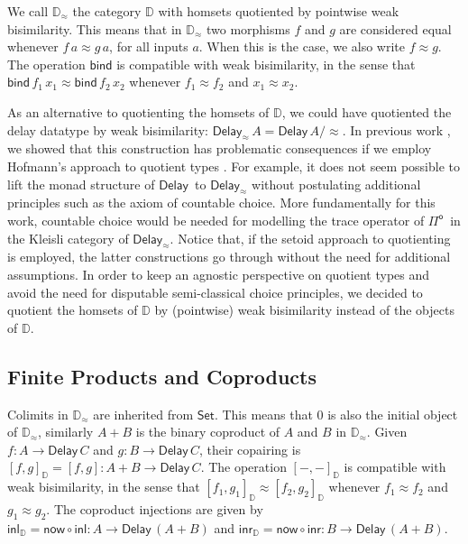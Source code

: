 \documentclass[runningheads,a4paper]{llncs}
\newcommand{\Pio}{\ensuremath{\mathsf{\Pi}^{\mathsf{o}}}}
\newcommand{\Set}{\mathsf{Set}}
\newcommand{\comp}{\circ}
\newcommand{\copair}[2]{[#1,#2]}
\newcommand{\inl}{\mathsf{inl}}
\newcommand{\inr}{\mathsf{inr}}
\newcommand{\Delay}{\ensuremath{\mathsf{Delay}\,}}
\newcommand{\now}{\mathsf{now}}
\newcommand{\bind}{\mathsf{bind}}
\newcommand{\D}{\mathbb{D}}
\newcommand{\Dapprox}{\mathbb{D}_{\approx}}
\newcommand{\copairD}[2]{[#1,#2]_{\D}}
\newcommand{\inlD}{\mathsf{inl}_{\D}}
\newcommand{\inrD}{\mathsf{inr}_{\D}}
\begin{document}
We call $\Dapprox$ the category $\D$ with homsets
quotiented by pointwise weak bisimilarity. This means that in
$\Dapprox$ two morphisms $f$ and $g$ are considered equal whenever
$f \, a \approx g \, a$, for all inputs $a$. When this is the case, we
also write $f \approx g$. The operation $\bind$ is compatible with
weak bisimilarity, in the sense that $\bind\,f_1\,x_1 \approx
\bind\,f_2\,x_2$ whenever $f_1 \approx f_2$ and $x_1 \approx x_2$.

As an alternative to quotienting the homsets of $\D$, we could have
quotiented the delay datatype by weak bisimilarity:
$\mathsf{Delay}_{\approx}\,A = \Delay A/{\approx}$. In previous work
\cite{ChapmanUV19}, we showed that this construction has problematic
consequences if we employ Hofmann's approach to quotient types
\cite{Hofmann}. For example, it does not seem possible to lift the
monad structure of $\Delay$ to $\mathsf{Delay}_{\approx}$ without
postulating additional principles such as the axiom of countable
choice. More fundamentally for this work, countable choice would be
needed for modelling the trace operator of \Pio\ in the Kleisli
category of $\mathsf{Delay}_{\approx}$. Notice that, if the setoid approach
to quotienting is employed, the latter constructions go through
without the need for additional assumptions. In order to keep an
agnostic perspective on quotient types and avoid the need for
disputable semi-classical choice principles, we decided to quotient
the homsets of $\D$ by (pointwise) weak bisimilarity instead of
the objects of $\D$.

\subsection{Finite Products and Coproducts}
\label{sec:prod}

Colimits in $\Dapprox$ are inherited from $\Set$. This means that 0 is
also the initial object of $\Dapprox$, similarly $A + B$ is the
binary coproduct of $A$ and $B$ in $\Dapprox$. Given $f : A \to
\Delay C$ and $g : B \to \Delay C$, their copairing is
$\copairD f g = \copair f g : A + B \to \Delay C$. The operation
$\copairD - -$ is compatible with weak bisimilarity, in the sense that
$\copairD{f_1}{g_1} \approx \copairD{f_2}{g_2}$ whenever $f_1 \approx f_2$
and $g_1 \approx g_2$.
The coproduct
injections are given by $\inlD = \now \comp \inl : A \to \Delay (A +
B)$ and $\inrD = \now \comp \inr : B \to \Delay (A + B)$.
\end{document}
